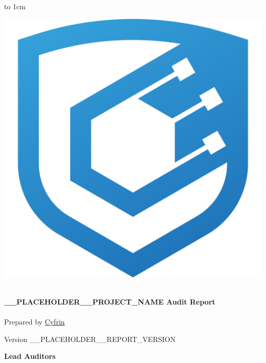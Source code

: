 \newlength{\logoWidth}
\setlength{\logoWidth}{0.5\textwidth}

\begin{titlepage}
  \normalsize %
  \vbox to 1cm{\vfill}

  \begin{center}    
    \includegraphics[width=\logoWidth]{img/cyfrin-logo.png} %
    
    \vspace{1cm}

    \noindent\makebox[\linewidth]{\rule{.75\paperwidth}{.6pt}}\\[0.7cm]

    {\huge \bfseries
      __PLACEHOLDER__PROJECT_NAME Audit Report
    }\\[0.25cm]
    
    \noindent\makebox[\linewidth]{\rule{.75\paperwidth}{.6pt}}\\[0.7cm]

    \large
    Prepared by \href{https://cyfrin.io}{Cyfrin}

    \large{
      Version __PLACEHOLDER__REPORT_VERSION
    }\\[1.2cm]
    
    \vfill

    \large
    {\bfseries Lead Auditors}\\


\end{center}
\end{titlepage}
